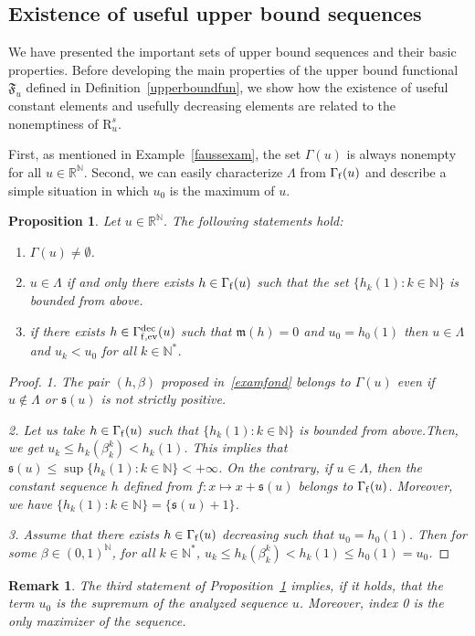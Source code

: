 \documentclass{article}
\def\valu#1{\mathfrak{s}(#1)}
\def\funset{\Gamma}
\def\fmonfung{{\funset}_{\rm f,{\rm ev}}^{\rm dec}}
\def\mon{\mathfrak{m}}
\def\secfunh{\funset_{\rm f}}
\def\Fu{\mathfrak{F}_u}
\def\rr{\mathbb R}
\def\nn{\mathbb N}
\def\gls#1{{\mathrm R}_{#1}}
\def\gsls#1{\gls{#1}^s}
\newtheorem{prop}{Proposition}
\newtheorem{remark}{Remark}
\def\blue#1{#1}
\begin{document}
	\subsection{Existence of useful upper bound sequences}
	We have presented the important sets of upper bound sequences and their basic properties. Before developing the main properties of the upper bound functional $\Fu$ defined in Definition~\ref{upperboundfun}, we show how the existence of useful constant elements and usefully decreasing elements are related to the nonemptiness of $\gsls{u}$.
	
	First, as mentioned in Example~\ref{faussexam}, the set $\funset(u)$ is always nonempty for all $u\in\rr^\nn$. Second, we can easily characterize $\Lambda$ from $\secfunh(u)$ and describe a simple situation in which $u_0$ is the maximum of $u$.
	\begin{prop}
		\label{nonemptyfun}
		Let $u\in\rr^\nn$. The following statements hold:
		\begin{enumerate}
			\item $\funset(u)\neq \emptyset$.
			\item $u\in\Lambda$ if and only there exists $h\in\secfunh(u)$ such that the set $\{h_k(1) : k\in\nn\}$ is bounded from above.
			\item if there exists \blue{$h\in\fmonfung(u)$ such that $\mon(h)=0$} and $u_0=h_0(1)$ then $u\in\Lambda$ and $u_k<u_0$ for all $k\in\nn^\blue{*}$.
		\end{enumerate}
	\end{prop}
	\begin{proof}
		\itshape{1.} 
		The pair $(h,\beta)$ proposed in~\eqref{examfond} belongs to $\funset(u)$ even if $u\notin\Lambda$ \blue{or} $\valu{u}$ is not strictly positive.
		
		\itshape{2.} Let us take $h\in\secfunh(u)$ such that $\{h_k(1): k\in\nn\}$ is bounded from above.\blue{Then, we get } $u_k\leq h_k(\beta_k^k) < h_k(1)$. \blue{This} implies that $\valu{u}\leq \sup \{h_k(1): k\in\nn\}<+\infty$. On the contrary, if $u\in\Lambda$, then the constant sequence $h$ defined from $f:x\mapsto x+\valu{u}$ belongs to $\secfunh(u)$. \blue{Moreover, we have} $\{h_k(1): k\in\nn\}=\{\valu{u}+1\}$.
		
		\itshape{3.} Assume that there exists $h\in\secfunh(u)$ decreasing such that $u_0=h_0(1)$. Then for some $\beta\in (0,1)^\nn$, for all $k\in\nn^*$, $u_k\leq h_k(\beta_k^k) < h_k(1)\leq h_0(1)=u_0$.
	\end{proof}
	\begin{remark}
		\label{zeroisopt}
		The third statement of Proposition~\ref{nonemptyfun} implies, if it holds, that the term $u_0$ is the supremum of the analyzed sequence $u$. Moreover, index 0 is the only maximizer of the sequence.
	\end{remark}
	
\end{document}

